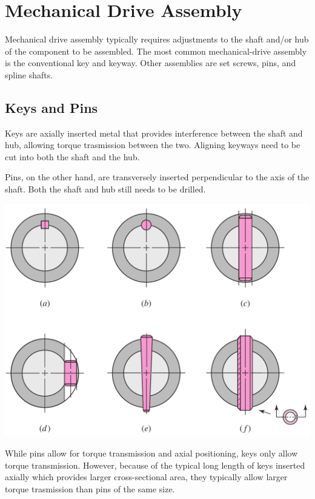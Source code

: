 \documentclass[a4paper,openany]{tufte-book}
\begin{document}
\section{Mechanical Drive Assembly}
\label{sec:org5aa1925}

Mechanical drive assembly typically requires adjustments to the shaft and/or hub of the component to be assembled. The most common mechanical-drive assembly is the conventional key and keyway. Other assemblies are set screws, pins, and spline shafts.

\subsection{Keys and Pins}
\label{sec:org0498368}

Keys are axially inserted metal that provides interference between the shaft and hub, allowing torque trasmission between the two. Aligning keyways need to be cut into both the shaft and the hub.

Pins, on the other hand, are transversely inserted perpendicular to the axis of the shaft. Both the shaft and hub still needs to be drilled.

\begin{center}
\includegraphics[width=.9\linewidth]{./pictures/Shafts/keys-pins.png}
\end{center}

While pins allow for torque transmission and axial positioning, keys only allow torque transmission. However, because of the typical long length of keys inserted axially which provides larger cross-sectional area, they typically allow larger torque trasmission than pins of the same size.
\end{document}
